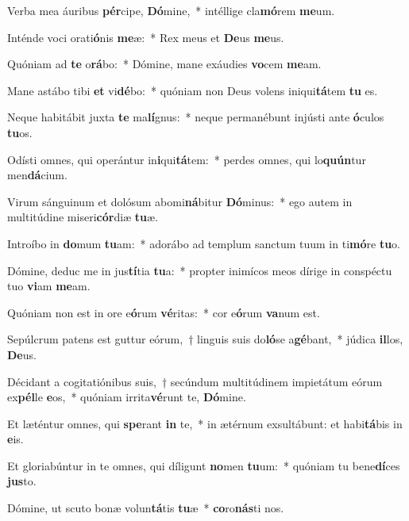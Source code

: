 \item Verba mea áuribus \textbf{pér}cipe, \textbf{Dó}mine,~* intéllige cla\textbf{mó}rem \textbf{me}um.
\item Inténde voci orati\textbf{ó}nis \textbf{me}æ:~* Rex meus et \textbf{De}us \textbf{me}us.
\item Quóniam ad \textbf{te} o\textbf{rá}bo:~* Dómine, mane exáudies \textbf{vo}cem \textbf{me}am.
\item Mane astábo tibi \textbf{et} vi\textbf{dé}bo:~* quóniam non Deus volens iniqui\textbf{tá}tem \textbf{tu} es.
\item Neque habitábit juxta \textbf{te} ma\textbf{lí}gnus:~* neque permanébunt injústi ante \textbf{ó}culos \textbf{tu}os.
\item Odísti omnes, qui operántur in\textbf{i}qui\textbf{tá}tem:~* perdes omnes, qui lo\textbf{quún}tur men\textbf{dá}cium.
\item Virum sánguinum et dolósum abomi\textbf{ná}bitur \textbf{Dó}minus:~* ego autem in multitúdine miseri\textbf{cór}diæ \textbf{tu}æ.
\item Introíbo in \textbf{do}mum \textbf{tu}am:~* adorábo ad templum sanctum tuum in ti\textbf{mó}re \textbf{tu}o.
\item Dómine, deduc me in jus\textbf{tí}tia \textbf{tu}a:~* propter inimícos meos dírige in conspéctu tuo \textbf{vi}am \textbf{me}am.
\item Quóniam non est in ore e\textbf{ó}rum \textbf{vé}ritas:~* cor e\textbf{ó}rum \textbf{va}num est.
\item Sepúlcrum patens est guttur eórum,~† linguis suis do\textbf{ló}se a\textbf{gé}bant,~* júdica \textbf{il}los, \textbf{De}us.
\item Décidant a cogitatiónibus suis,~† secúndum multitúdinem impietátum eórum ex\textbf{pél}le \textbf{e}os,~* quóniam irrita\textbf{vé}runt te, \textbf{Dó}mine.
\item Et læténtur omnes, qui \textbf{spe}rant \textbf{in} te,~* in ætérnum exsultábunt: et habi\textbf{tá}bis in \textbf{e}is.
\item Et gloriabúntur in te omnes, qui díligunt \textbf{no}men \textbf{tu}um:~* quóniam tu bene\textbf{dí}ces \textbf{jus}to.
\item Dómine, ut scuto bonæ volun\textbf{tá}tis \textbf{tu}æ~* \textbf{co}ro\textbf{nás}ti nos.
